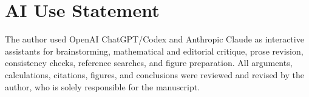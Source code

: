 \documentclass[aps,prd,10pt,onecolumn,nofootinbib,superscriptaddress,floatfix]{revtex4-2}
\begin{document}
\section*{AI Use Statement}

The author used OpenAI ChatGPT/Codex and Anthropic Claude as interactive
assistants for brainstorming, mathematical and editorial critique, prose
revision, consistency checks, reference searches, and figure preparation.  All
arguments, calculations, citations, figures, and conclusions were reviewed and
revised by the author, who is solely responsible for the manuscript.



\end{document}
